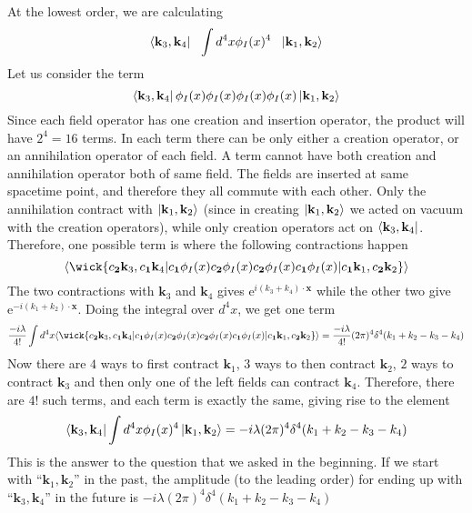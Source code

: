 \documentclass[11pt]{article}
\newcommand{\e}{\mathrm{e}}
\renewcommand{\c}[1]{c_\mathbf{#1}}
\numberwithin{equation}{section}
\begin{document}
    At the lowest order, we are calculating 
    \begin{equation*}
        \bra{\textbf{k}_3, \textbf{k}_4} ~~ \int d^4x \phi_I(x)^4~~ \ket{\textbf{k}_1, \textbf{k}_2}
    \end{equation*}
    Let us consider the term 
    \begin{equation*}
        \bra{\textbf{k}_3, \textbf{k}_4} \phi_I(x)\phi_I(x)\phi_I(x)\phi_I(x) \ket{\textbf{k}_1, \textbf{k}_2}
    \end{equation*}
    Since each field operator has one creation and insertion operator, the product will have \(2^4 = 16\) terms. In each term there can be only either a creation operator, or an annihilation operator of each field. A term cannot have both creation and annihilation operator both of same field. The fields are inserted at same spacetime point, and therefore they all commute with each other. Only the annihilation contract with \( \ket{\textbf{k}_1, \textbf{k}_2}\) (since in creating \(\ket{\textbf{k}_1, \textbf{k}_2}\) we acted on vacuum with the creation operators), while only creation operators act on \(\bra{\textbf{k}_3, \textbf{k}_4}\). Therefore, one possible term is where the following contractions happen 
    \begin{equation*}
        \langle \wick{\c2{\mathbf{k}_3},\c1{\mathbf{k}_4}| \c1 \phi_I(x) \c2 \phi_I(x) \c2 \phi_I(x) \c1 \phi_I(x) | \c1{\mathbf{k}_1},\c2{\mathbf{k}_2}}\rangle 
    \end{equation*}
    The two contractions with \(\textbf{k}_3\) and \(\textbf{k}_4\) gives \(\e^{i(k_3 + k_4)\cdot \textbf{x}}\) while the other two give \(\e^{-i(k_1 + k_2)\cdot \textbf{x}}\). Doing the integral over \(d^4x\), we get one term 
    \begin{equation*}
        \frac{-i\lambda}{4!}\int d^4x \langle \wick{\c2{\mathbf{k}_3},\c1{\mathbf{k}_4}| \c1 \phi_I(x) \c2 \phi_I(x) \c2 \phi_I(x) \c1 \phi_I(x) | \c1{\mathbf{k}_1},\c2{\mathbf{k}_2}}\rangle  = \frac{-i\lambda}{4!}(2\pi)^4 \delta^4(k_1 + k_2 - k_3 - k_4) 
    \end{equation*}
    Now there are \(4\) ways to first contract \(\textbf{k}_1\), \(3\) ways to then contract \(\textbf{k}_2\), \(2\) ways to contract \(\textbf{k}_3\) and then only one of the left fields can contract \(\textbf{k}_4\). Therefore, there are \(4!\) such terms, and each term is exactly the same, giving rise to the element 
    \begin{equation*}
        \bra{\textbf{k}_3, \textbf{k}_4} \int d^4x \phi_I(x)^4 \ket{\textbf{k}_1, \textbf{k}_2} = -i\lambda(2\pi)^4 \delta^4(k_1 + k_2 - k_3 - k_4) 
    \end{equation*} 
    This is the answer to the question that we asked in the beginning. If we start with ``\(\textbf{k}_1,\textbf{k}_2\)'' in the past, the amplitude (to the leading order) for ending up with ``\(\textbf{k}_3, \textbf{k}_4\)'' in the future is \(-i\lambda(2\pi)^4 \delta^4(k_1 + k_2 - k_3 - k_4)\)\\
\end{document}
